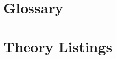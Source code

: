 \appendix

\vfill

\section{Glossary}




\section{Theory Listings}
{
\let\Section\subsection
\let\Subsection\subsubsection
\def\subsection#1{\Subsection*{#1}}
\def\section#1{\Section{#1}\label{ariscat}}

\def\section#1{\Section{#1}\label{syllog1}}

\def\section#1{\Section{#1}\label{syllog2}}

\def\section#1{\Section{#1}\label{syllog3}}

\def\section#1{\Section{#1}\label{modsyllog}}

\def\section#1{\Section{#1}\label{syllmetap}}

\def\section#1{\Section{#1}\label{gccon}}

}  %

